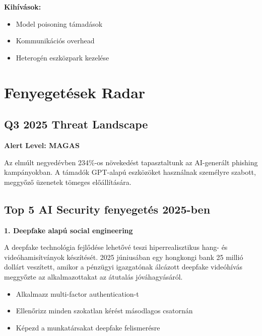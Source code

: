 \documentclass{../templates/magazine}
\begin{document}
\textbf{Kihívások:}
\begin{itemize}
    \item Model poisoning támadások
    \item Kommunikációs overhead
    \item Heterogén eszközpark kezelése
\end{itemize}

\newpage

\section{Fenyegetések Radar}

\subsection{Q3 2025 Threat Landscape}

\begin{warningbox}
\textbf{Alert Level: MAGAS}

Az elmúlt negyedévben 234\%-os növekedést tapasztaltunk az AI-generált phishing kampányokban. A támadók GPT-alapú eszközöket használnak személyre szabott, meggyőző üzenetek tömeges előállítására.
\end{warningbox}

\subsection{Top 5 AI Security fenyegetés 2025-ben}

\textbf{1. Deepfake alapú social engineering}

A deepfake technológia fejlődése lehetővé teszi hiperrealisztikus hang- és videóhamisítványok készítését. 2025 júniusában egy hongkongi bank 25 millió dollárt veszített, amikor a pénzügyi igazgatónak álcázott deepfake videóhívás meggyőzte az alkalmazottakat az átutalás jóváhagyásáról.

\begin{tipbox}[Védekezés]
\begin{itemize}
    \item Alkalmazz multi-factor authentication-t
    \item Ellenőrizz minden szokatlan kérést másodlagos csatornán
    \item Képezd a munkatársakat deepfake felismerésre
\end{itemize}
\end{tipbox}
\end{document}
